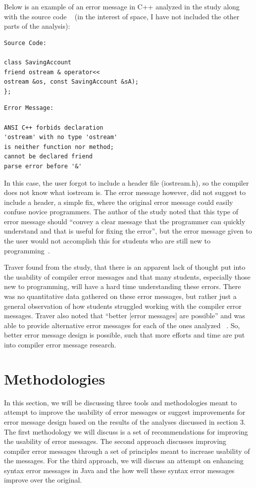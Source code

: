 \documentclass{sig-alternate}
\begin{document}
Below is an example of an error message in C++ analyzed in the study along with the source code ~\cite{Traver:2010} (in the interest of space, I have not included the other parts of the analysis):

\begin{verbatim}
Source Code:

class SavingAccount 
friend ostream & operator<<
ostream &os, const SavingAccount &sA);
};
\end{verbatim}

\begin{verbatim}
Error Message:

ANSI C++ forbids declaration 
'ostream' with no type 'ostream'
is neither function nor method; 
cannot be declared friend
parse error before '&'
\end{verbatim}


In this case, the user forgot to include a header file (iostream.h), so the compiler does not know what iostream is.
The error message however, did not suggest to include a header, a simple fix, where the original error message could easily confuse novice programmers.
The author of the study noted that this type of error message should ``convey a clear message that the programmer can quickly understand and that is useful for fixing the error'', but the error message given to the user would not accomplish this for students who are still new to programming~\cite{Traver:2010}.

Traver found from the study, that there is an apparent lack of thought put into the usability of compiler error messages and that many students, especially those new to programming, will have a hard time understanding these errors.
There was no quantitative data gathered on these error messages, but rather just a general observation of how students struggled working with the compiler error messages.
Traver also noted that ``better [error messages] are possible'' and was able to provide alternative error messages for each of the ones analyzed ~\cite{Traver:2010}.
So, better error message design is possible, such that more efforts and time are put into compiler error message research. 

\section{Methodologies}\label{sec:methodologies}
In this section, we will be discussing three tools and methodologies meant to attempt to improve the usability of error messages or suggest improvements for error message design based on the results of the analyses discussed in section 3.
The first methodology we will discuss is a set of recommendations for improving the usability of error messages.
The second approach discusses improving compiler error messages through a set of principles meant to increase usability of the messages.
For the third approach, we will discuss an attempt on enhancing syntax error messages in Java and the how well these syntax error messages improve over the original. 
\end{document}
